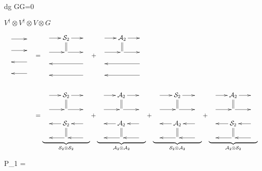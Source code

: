 \beq
\int dg\; G\otimes G=0\quad
{}
\eeq

$
V^\dagger \otimes V^\dagger
\otimes  V\otimes G$

\begin{align}
\bcen
\xymatrix@R=1pc{
\ar[r]&
\\
\ar[r]&
\\
&\ar[l]
\\
&\ar[l]
}
\ecen
&=
\bcen
\xymatrix@R=1pc@C=1.5pc{
\ar[r]&\cals_2
\ar@2{-}[d]\ar[r]&
\\
\ar[r]&\ar[r]&
\\
&&\ar[ll]
\\
&&\ar[ll]
}
\ecen
+
\bcen
\xymatrix@R=1pc@C=1.5pc{
\ar[r]&\cala_2
\ar@2{-}[d]\ar[r]&
\\
\ar[r]&\ar[r]&
\\
&&\ar[ll]
\\
&&\ar[ll]
}
\ecen
\\
\\
&=
\underbrace{\bcen
\xymatrix@R=1pc@C=1.5pc{
\ar[r]&\cals_2
\ar@2{-}[d]\ar[r]&
\\
\ar[r]&\ar[r]&
\\
&\cals_2\ar[l]
\ar@2{-}[d]&\ar[l]
\\
&\ar[l]&\ar[l]
}
\ecen}_{\cals_2\otimes\cals_2}
+
\underbrace{\bcen
\xymatrix@R=1pc@C=1.5pc{
\ar[r]&\cala_2
\ar@2{-}[d]\ar[r]&
\\
\ar[r]&\ar[r]&
\\
&\cala_2\ar[l]
\ar@2{-}[d]&\ar[l]
\\
&\ar[l]&\ar[l]
}
\ecen}_{\cala_2\otimes\cala_2}
+
\underbrace{\bcen
\xymatrix@R=1pc@C=1.5pc{
\ar[r]&\cals_2
\ar@2{-}[d]\ar[r]&
\\
\ar[r]&\ar[r]&
\\
&\cala_2\ar[l]
\ar@2{-}[d]&\ar[l]
\\
&\ar[l]&\ar[l]
}
\ecen}_{\cals_2\otimes\cala_2}
+
\underbrace{\bcen
\xymatrix@R=1pc@C=1.5pc{
\ar[r]&\cala_2
\ar@2{-}[d]\ar[r]&
\\
\ar[r]&\ar[r]&
\\
&\cals_2\ar[l]
\ar@2{-}[d]&\ar[l]
\\
&\ar[l]&\ar[l]
}
\ecen}_{\cala_2\otimes\cals_2}
\end{align}

\beq
P_1 =
\bcen
{}
\ecen
\eeq

